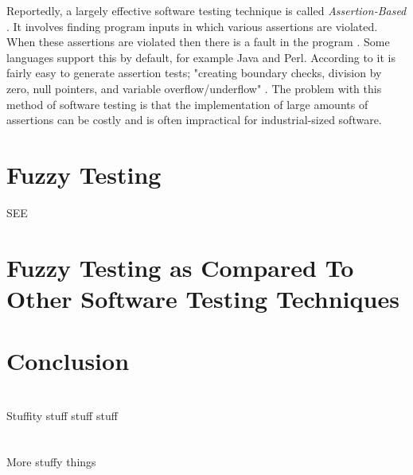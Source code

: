 \documentclass[10pt, final, journal, letterpaper, twoside, twocolumn]{IEEEtran}
\begin{document}
	Reportedly, a largely effective software testing technique is called \textit{Assertion-Based} \cite{assertion}. It involves finding program inputs in which various assertions are violated. When these assertions are violated then there is a fault in the program \cite{assertion}. Some languages support this by default, for example Java and Perl. According to \cite{fuzzy-logic} it is fairly easy to generate assertion tests; "creating boundary checks, division by zero, null pointers, and variable overflow/underflow" \cite{fuzzy-logic}. The problem with this method of software testing is that the implementation of large amounts of assertions can be costly and is often impractical for industrial-sized software. 


\section{Fuzzy Testing}
	
	SEE \cite{break-software}
	
	
		
	

\section{Fuzzy Testing as Compared To Other Software Testing Techniques}
	

\section{Conclusion}

\pagebreak
	
\appendices
	\section{}
		Stuffity stuff stuff stuff
	\section{}
		More stuffy things
	
\newpage
\nocite{*}


\end{document}
